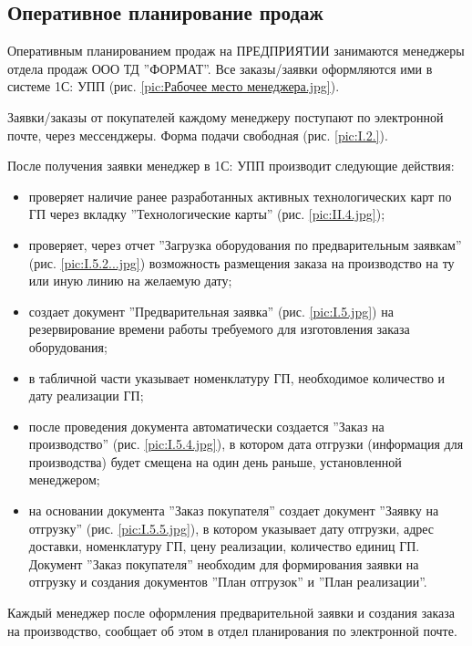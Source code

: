 \newpage
\subsection{Оперативное планирование продаж}
\label{bp:salesplan}


Оперативным планированием продаж на ПРЕДПРИЯТИИ занимаются менеджеры отдела продаж ООО ТД ''ФОРМАТ''. Все заказы/заявки оформляются ими в системе 1С: УПП (рис. \ref{pic:Рабочее место менеджера.jpg}).

Заявки/заказы от покупателей каждому менеджеру поступают по электронной почте, через мессенджеры. Форма подачи свободная (рис. \ref{pic:I.2.}).

После получения заявки менеджер в 1С: УПП производит следующие действия:
\begin{itemize}
    \item проверяет наличие ранее разработанных активных технологических карт по ГП через вкладку ''Технологические карты'' (рис. \ref{pic:II.4.jpg}); 
    \item проверяет, через отчет ''Загрузка оборудования по предварительным заявкам'' (рис. \ref{pic:I.5.2...jpg}) возможность размещения заказа на производство на ту или иную линию на желаемую дату;
    \item создает документ ''Предварительная заявка'' (рис. \ref{pic:I.5.jpg}) на резервирование времени работы требуемого для изготовления заказа оборудования;
    \item в табличной части указывает номенклатуру ГП, необходимое количество и дату реализации ГП;
    \item после проведения документа автоматически создается ''Заказ на производство'' (рис. \ref{pic:I.5.4.jpg}), в котором дата отгрузки (информация для производства) будет смещена на один день раньше, установленной менеджером;
    \item на основании документа ''Заказ покупателя''
    создает документ ''Заявку на отгрузку'' (рис. \ref{pic:I.5.5.jpg}), в котором указывает дату отгрузки, адрес доставки, номенклатуру ГП, цену реализации, количество единиц ГП. 
    Документ ''Заказ покупателя'' необходим для формирования заявки на отгрузку и создания документов ''План отгрузок'' и ''План реализации''.
   
\end{itemize}


Каждый менеджер после оформления предварительной заявки и создания заказа на производство, сообщает об этом в отдел планирования по электронной почте. %


